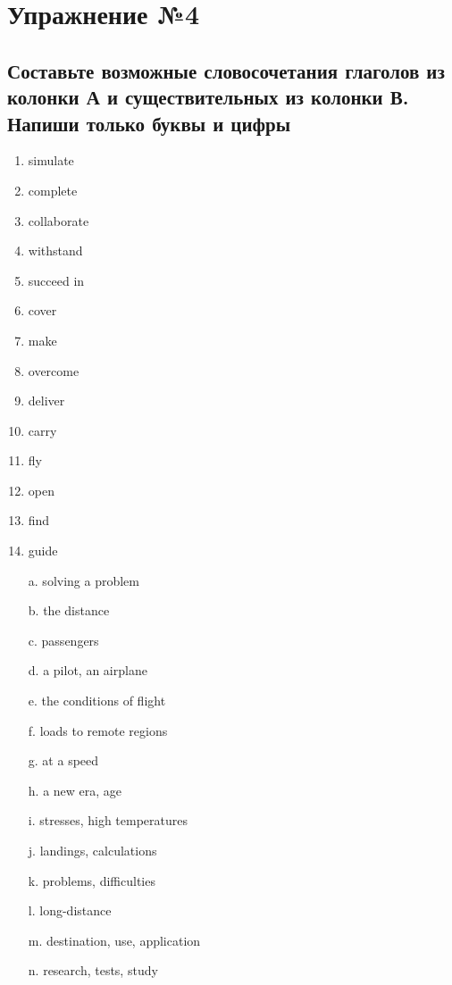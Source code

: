 \section{Упражнение №4}
\subsection*{Составьте возможные словосочетания глаголов из колонки А и существительных из колонки В. Напиши только буквы и цифры}

\begin{enumerate}
      \item simulate
      \item complete
      \item collaborate
      \item withstand
      \item succeed in
      \item cover
      \item make
      \item overcome
      \item deliver
      \item carry
      \item fly
      \item open
      \item find
      \item guide
\end{enumerate}

\begin{itemize}
      \item[a.] solving a problem
      \item[b.] the distance
      \item[c.] passengers
      \item[d.] a pilot, an airplane
      \item[e.] the conditions of flight
      \item[f.] loads to remote regions
      \item[g.] at a speed
      \item[h.] a new era, age
      \item[i.] stresses, high temperatures
      \item[j.] landings, calculations
      \item[k.] problems, difficulties
      \item[l.] long-distance
      \item[m.] destination, use, application
      \item[n.] research, tests, study
\end{itemize}


